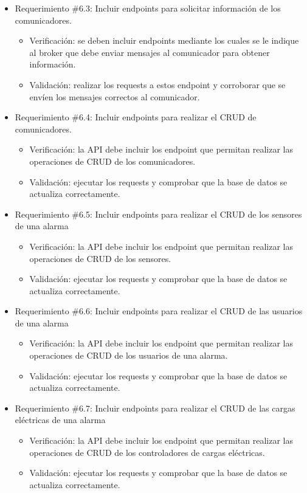 \documentclass[
11pt, %
codirector, %
]{charter}
\begin{document}
\begin{itemize}
	\item Requerimiento \#6.3: Incluir endpoints para solicitar información de los comunicadores.
	\begin{itemize}
		\item Verificación: se deben incluir endpoints mediante los cuales se le indique al broker que debe enviar mensajes al comunicador para obtener información.
		\item Validación: realizar los requests a estos endpoint y corroborar que se envíen los mensajes correctos al comunicador.
	\end{itemize}
			
	\item Requerimiento \#6.4: Incluir endpoints para realizar el CRUD de comunicadores.
	\begin{itemize}
		\item Verificación: la API debe incluir los endpoint que permitan realizar las operaciones de CRUD de los comunicadores.
		\item Validación: ejecutar los requests y comprobar que la base de datos se actualiza correctamente.
	\end{itemize}
			
	\item Requerimiento \#6.5: Incluir endpoints para realizar el CRUD de los sensores de una alarma
	\begin{itemize}
		\item Verificación: la API debe incluir los endpoint que permitan realizar las operaciones de CRUD de los sensores.
		\item Validación: ejecutar los requests y comprobar que la base de datos se actualiza correctamente.
	\end{itemize}
			
	\item Requerimiento \#6.6: Incluir endpoints para realizar el CRUD de las usuarios de una alarma
	\begin{itemize}
		\item Verificación: la API debe incluir los endpoint que permitan realizar las operaciones de CRUD de los usuarios de una alarma.
		\item Validación: ejecutar los requests y comprobar que la base de datos se actualiza correctamente.
	\end{itemize}
			
	\item Requerimiento \#6.7: Incluir endpoints para realizar el CRUD de las cargas eléctricas de una alarma
	\begin{itemize}
		\item Verificación: la API debe incluir los endpoint que permitan realizar las operaciones de CRUD de los controladores de cargas eléctricas.
		\item Validación: ejecutar los requests y comprobar que la base de datos se actualiza correctamente.
	\end{itemize}
			

\end{itemize}
\end{document}
